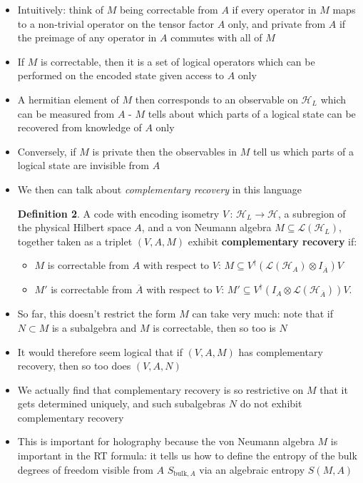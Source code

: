 \documentclass[12pt,a4paper]{article}
\numberwithin{equation}{section}
\newcommand{\ol}[1]{\overline{#1}}
\theoremstyle{definition}
\newtheorem{definition}{Definition}[section]
\theoremstyle{theorem}
\theoremstyle{example}
\begin{document}
\begin{itemize}
\begin{definition}[Correctable and Private Algebra]
\begin{itemize}
			\end{itemize}
		\end{definition}
		\item Intuitively: think of $M$ being correctable from $A$ if every operator in $M$ maps to a non-trivial operator on the tensor factor $A$ only, and private from $A$ if the preimage of any operator in $A$ commutes with all of $M$
		\item If $M$ is correctable, then it is a set of logical operators which can be performed on the encoded state given access to $A$ only
		\item A hermitian element of $M$ then corresponds to an observable on $\mathcal{H}_{L}$ which can be measured from $A$ - $M$ tells about which parts of a logical state can be recovered from knowledge of $A$ only
		\item Conversely, if $M$ is private then the observables in $M$ tell us which parts of a logical state are invisible from $A$
		\item We then can talk about \textit{complementary recovery} in this language
		\begin{definition}
			A code with encoding isometry $V\,:\,\mathcal{H}_{L}\to\mathcal{H}$, a subregion of the physical Hilbert space $A$, and a von Neumann algebra $M\subseteq\mathcal{L}(\mathcal{H}_{L})$, together taken as a triplet $(V,A,M)$ exhibit \textbf{complementary recovery} if:
			\begin{itemize}
				\item $M$ is correctable from $A$ with respect to $V$: $M\subseteq V^{\dagger}(\mathcal{L}(\mathcal{H}_{A})\otimes I_{\ol{A}})V$
				\item $M'$ is correctable from $\ol{A}$ with respect to $V$: $M'\subseteq V^{\dagger}(I_{A}\otimes \mathcal{L}(\mathcal{H}_{\ol{A}}))V$.
			\end{itemize}
		\end{definition}
		\item So far, this doesn't restrict the form $M$ can take very much: note that if $N\subset M$ is a subalgebra and $M$ is correctable, then so too is $N$
		\item It would therefore seem logical that if $(V,A,M)$ has complementary recovery, then so too does $(V,A,N)$
		\item We actually find that complementary recovery is so restrictive on $M$ that it gets determined uniquely, and such subalgebras $N$ do not exhibit complementary recovery
		\item This is important for holography because the von Neumann algebra $M$ is important in the RT formula: it tells us how to define the entropy of the bulk degrees of freedom visible from $A$ $S_{\text{bulk},A}$ via an algebraic entropy $S(M,A)$

\end{itemize}
\end{document}
